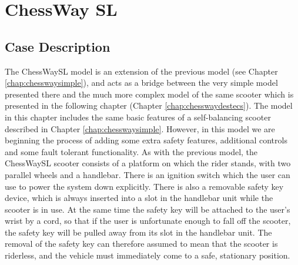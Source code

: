 \chapter{ChessWay SL} \label{chap:chesswaysl}

\section{Case Description}
The ChessWaySL model is an extension of the previous model (see
Chapter \ref{chap:chesswaysimple}), and acts as a bridge between the
very simple model presented there and the much more complex model of
the same scooter which is presented in the following chapter (Chapter
\ref{chap:chesswaydestecs}).  The model in this chapter includes the
same basic features of a self-balancing scooter described in Chapter
\ref{chap:chesswaysimple}.  However, in this model we are beginning
the process of adding some extra safety features, additional controls
and some fault tolerant functionality. As with the previous model, the
ChessWaySL scooter consists of a platform on which the rider stands,
with two parallel wheels and a handlebar. There is an ignition switch
which the user can use to power the system down explicitly. There is
also a removable safety key device, which is always inserted into a
slot in the handlebar unit while the scooter is in use. At the same
time the safety key will be attached to the user's wrist by a cord, so
that if the user is unfortunate enough to fall off the scooter, the
safety key will be pulled away from its slot in the handlebar
unit. The removal of the safety key can therefore assumed to mean that
the scooter is riderless, and the vehicle must immediately come to a
safe, stationary position.

